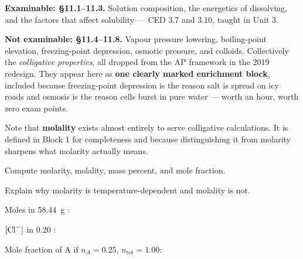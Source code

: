 \documentclass{apchem-notes}
\begin{document}
\apctitleblock

\begin{apcnote}
\textbf{Examinable: \S11.1--11.3.} Solution composition, the energetics of
dissolving, and the factors that affect solubility --- CED 3.7 and 3.10,
taught in Unit 3.

\textbf{Not examinable: \S11.4--11.8.} Vapour pressure lowering,
boiling-point elevation, freezing-point depression, osmotic pressure, and
colloids. Collectively the \emph{colligative properties}, all dropped from
the AP framework in the 2019 redesign. They appear here as
\textbf{one clearly marked enrichment block}, included because freezing-point
depression is the reason salt is spread on icy roads and osmosis is the
reason cells burst in pure water --- worth an hour, worth zero exam points.

Note that \textbf{molality} exists almost entirely to serve colligative
calculations. It is defined in Block 1 for completeness and because
distinguishing it from molarity sharpens what molarity actually means.
\end{apcnote}


\begin{objectives}
  \item Compute molarity, molality, mass percent, and mole fraction.
  \item Explain why molarity is temperature-dependent and molality is not.
\end{objectives}


\begin{warmup}[3]
  \item Moles in \SI{58.44}{\gram} :
  \item $[\ce{Cl-}]$ in \SI{0.20}{\Molar} :
  \item Mole fraction of A if $n_A = 0.25$, $n_{\text{tot}} = 1.00$:
\end{warmup}


\end{document}
